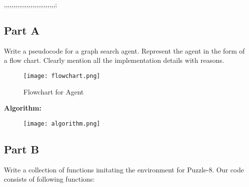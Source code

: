 ,,,,,,,,,,,,,,,,,,,,,,,,,,,;\documentclass[conference]{IEEEtran}
\begin{document}
\subsection{Part A}
Write a pseudocode for a graph search agent. Represent
the agent in the form of a flow chart. Clearly mention all the
implementation details with reasons.
\begin{figure}[htbp]
\centerline{\texttt{[image: flowchart.png]}}
\caption{Flowchart for Agent}
\label{fig}
\end{figure}
\newline
\textbf{Algorithm:}
\begin{figure}[htbp]
\centerline{\texttt{[image: algorithm.png]}}
\end{figure}


\subsection{Part B}
Write a collection of functions imitating the environment
for Puzzle-8. Our code consists of following functions:
\end{document}
